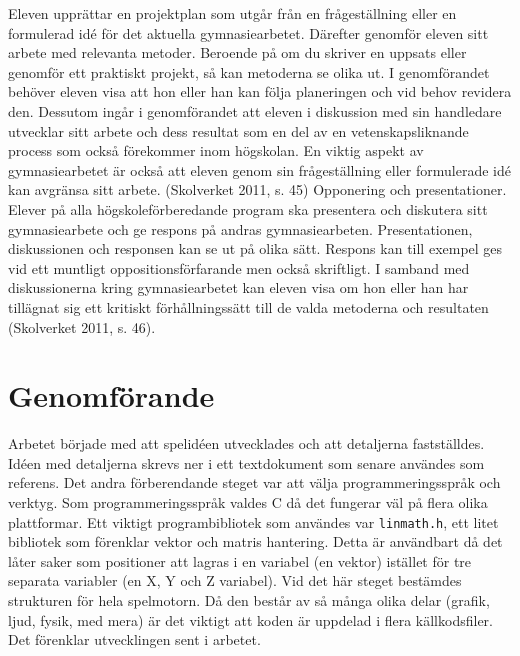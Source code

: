 \documentclass[12pt, a4paper]{article}
\newcommand{\code}{\texttt}
\begin{document}
	\begin{small}
		Eleven upprättar en projektplan som utgår från en frågeställning eller en
formulerad idé för det aktuella gymnasiearbetet. Därefter genomför eleven sitt
arbete med relevanta metoder. Beroende på om du skriver en uppsats eller
genomför ett praktiskt projekt, så kan metoderna se olika ut. I genomförandet
behöver eleven visa att hon eller han kan följa planeringen och vid behov
revidera den. Dessutom ingår i genomförandet att eleven i diskussion med sin
handledare utvecklar sitt arbete och dess resultat som en del av en
vetenskapsliknande process som också förekommer inom högskolan. En viktig
aspekt av gymnasiearbetet är också att eleven genom sin frågeställning eller
formulerade idé kan avgränsa sitt arbete. (Skolverket 2011, s. 45)
Opponering och presentationer. Elever på alla högskoleförberedande program
ska presentera och diskutera sitt gymnasiearbete och ge respons på andras
gymnasiearbeten. Presentationen, diskussionen och responsen kan se ut på
olika sätt. Respons kan till exempel ges vid ett muntligt oppositionsförfarande
men också skriftligt. I samband med diskussionerna kring gymnasiearbetet kan
eleven visa om hon eller han har tillägnat sig ett kritiskt förhållningssätt till de
valda metoderna och resultaten (Skolverket 2011, s. 46).
	\end{small}
	
	\newpage
	\section{Genomförande}
	
	Arbetet började med att spelidéen utvecklades och att detaljerna fastställdes. Idéen med detaljerna skrevs ner i ett textdokument som senare användes som referens. Det andra förberendande steget var att välja programmeringsspråk och verktyg. Som programmeringsspråk valdes C då det fungerar väl på flera olika plattformar. Ett viktigt programbibliotek som användes var \code{linmath.h}, ett litet bibliotek som förenklar vektor och matris hantering. Detta är användbart då det låter saker som positioner att lagras i en variabel (en vektor) istället för tre separata variabler (en X, Y och Z variabel). Vid det här steget bestämdes strukturen för hela spelmotorn. Då den består av så många olika delar (grafik, ljud, fysik, med mera) är det viktigt att koden är uppdelad i flera källkodsfiler. Det förenklar utvecklingen sent i arbetet. 
	
\end{document}
